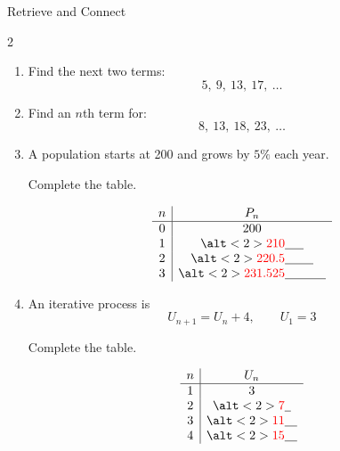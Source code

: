 \documentclass{beamer}
\newcommand{\ablank}[1]{%
  \alt<2>{\textcolor{red}{#1}}{\underline{\phantom{#1}}}%
}
\newcommand{\ashow}[1]{\uncover<2->{\textcolor{red}{\small #1}}}
\begin{document}
\begin{frame}{Retrieve and Connect}
\hypertarget{q-st1}{}

\small

\begin{multicols}{2}

\begin{enumerate}

\item Find the next two terms:
\[
5,\ 9,\ 13,\ 17,\ \dots
\]

\ashow{$21,\ 25$}

\vspace{0.4cm}

\item Find an $n$th term for:
\[
8,\ 13,\ 18,\ 23,\ \dots
\]

\ashow{$5n+3$}

\vspace{0.4cm}

\item A population starts at 200 and grows by $5\%$ each year.

Complete the table.

\[
\begin{array}{c|c}
n & P_n \\
\hline
0 & 200 \\
1 & \ablank{210} \\
2 & \ablank{220.5} \\
3 & \ablank{231.525}
\end{array}
\]

\vspace{0.2cm}


\vspace{0.4cm}

\item An iterative process is
\[
U_{n+1} = U_n + 4, \qquad U_1 = 3
\]

Complete the table.

\[
\begin{array}{c|c}
n & U_n \\
\hline
1 & 3 \\
2 & \ablank{7} \\
3 & \ablank{11} \\
4 & \ablank{15}
\end{array}
\]

\end{enumerate}

\end{multicols}

\end{frame}
\end{document}
